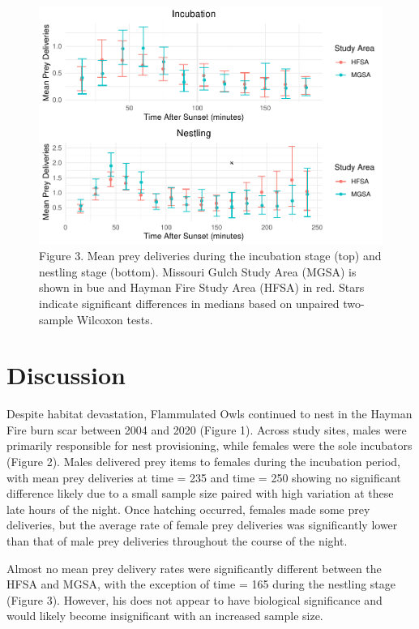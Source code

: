 \documentclass[]{article}
\begin{document}
\begin{figure}
\centering
\includegraphics{../manuscript/figures/plot_site-1.pdf}
\caption{Figure 3. Mean prey deliveries during the incubation stage
(top) and nestling stage (bottom). Missouri Gulch Study Area (MGSA) is
shown in bue and Hayman Fire Study Area (HFSA) in red. Stars indicate
significant differences in medians based on unpaired two-sample Wilcoxon
tests.}
\end{figure}

\hypertarget{discussion}{%
\section{Discussion}\label{discussion}}

Despite habitat devastation, Flammulated Owls continued to nest in the
Hayman Fire burn scar between 2004 and 2020 (Figure 1). Across study
sites, males were primarily responsible for nest provisioning, while
females were the sole incubators (Figure 2). Males delivered prey items
to females during the incubation period, with mean prey deliveries at
time = 235 and time = 250 showing no significant difference likely due
to a small sample size paired with high variation at these late hours of
the night. Once hatching occurred, females made some prey deliveries,
but the average rate of female prey deliveries was significantly lower
than that of male prey deliveries throughout the course of the night.

Almost no mean prey delivery rates were significantly different between
the HFSA and MGSA, with the exception of time = 165 during the nestling
stage (Figure 3). However, his does not appear to have biological
significance and would likely become insignificant with an increased
sample size.
\end{document}

